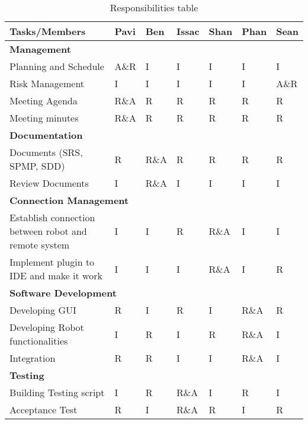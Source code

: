 \begin{table}[]
	\centering
	\caption{Responsibilities table}
	\label{my-label}
	\begin{tabular}{|l|l|l|l|l|l|l|}
		\hline
		Tasks/Members                                        & Pavi & Ben  & Issac & Shan & Phan & Sean \\ \hline
		\multicolumn{7}{|l|}{\textbf{Management}}                                                       \\ \hline
		Planning and Schedule                                & A\&R & I    & I     & I    & I    & I    \\ \hline
		Risk Management                                      & I    & I    & I     & I    & I    & A\&R \\ \hline
		Meeting Agenda                                       & R\&A & R    & R     & R    & R    & R    \\ \hline
		Meeting minutes                                      & R\&A & R    & R     & R    & R    & R    \\ \hline
		\multicolumn{7}{|l|}{\textbf{Documentation}}                                                    \\ \hline
		Documents (SRS, SPMP, SDD)                           & R    & R\&A & R     & R    & R    & R    \\ \hline
		Review Documents                                     & I    & R\&A & I     & I    & I    & I    \\ \hline
		\multicolumn{7}{|l|}{\textbf{Connection Management}}                                            \\ \hline
		Establish connection between robot and remote system & I    & I    & R     & R\&A & I    & I    \\ \hline
		Implement plugin to IDE and make it work             & I    & I    & I     & R\&A & I    & R    \\ \hline
		\multicolumn{7}{|l|}{\textbf{Software Development}}                                             \\ \hline
		Developing GUI                                       & R    & I    & R     & I    & R\&A & R    \\ \hline
		Developing Robot functionalities                     & I    & R    & I     & R    & R\&A & I    \\ \hline
		Integration                                          & R    & R    & I     & I    & R\&A & I    \\ \hline
		\multicolumn{7}{|l|}{\textbf{Testing}}                                                          \\ \hline
		Building Testing script                              & I    & R    & R\&A  & I    & R    & I    \\ \hline
		Acceptance Test                                      & R    & I    & R\&A  & R    & I    & R    \\ \hline
	\end{tabular}
\end{table}
